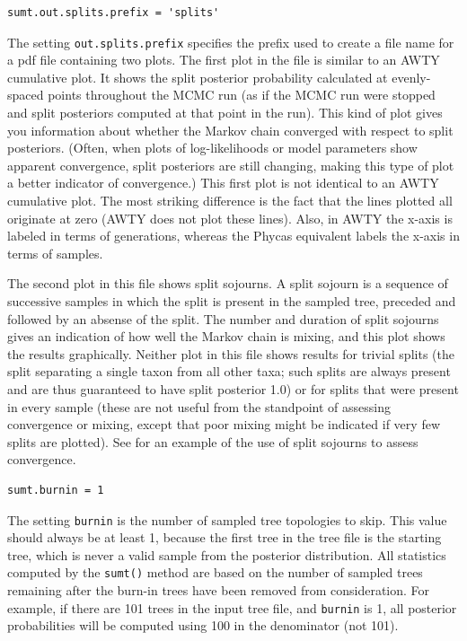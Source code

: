 \documentclass[10pt]{article}
\newcommand{\opt}[1]{{\tt \small #1}\index{#1}}	%
\begin{document}
\begin{samepage}
\begin{verbatim}
sumt.out.splits.prefix = 'splits'
\end{verbatim}
The setting \opt{out.splits.prefix} specifies the prefix used to create a file name for a pdf file containing two plots. The first plot in the file is similar to an AWTY \citep[][\url{http://king2.scs.fsu.edu/CEBProjects/awty/awty_start.php}]{Nylander:2008p471} cumulative plot. It shows the split posterior probability calculated at evenly-spaced points throughout the MCMC run (as if the MCMC run were stopped and split posteriors computed at that point in the run). This kind of plot gives you information about whether the Markov chain converged with respect to split posteriors. (Often, when plots of log-likelihoods or model parameters show apparent convergence, split posteriors are still changing, making this type of plot a better indicator of convergence.) This first plot is not identical to an AWTY cumulative plot. The most striking difference is the fact that the lines plotted all originate at zero (AWTY does not plot these lines). Also, in AWTY the x-axis is labeled in terms of generations, whereas the Phycas equivalent labels the x-axis in terms of samples. 

The second plot in this file shows split sojourns. A split sojourn is a sequence of successive samples in which the split is present in the sampled tree, preceded and followed by an absense of the split. The number and duration of split sojourns gives an indication of how well the Markov chain is mixing, and this plot shows the results graphically. Neither plot in this file shows results for trivial splits (the split separating a single taxon from all other taxa; such splits are always present and are thus guaranteed to have split posterior 1.0) or for splits that were present in every sample (these are not useful from the standpoint of assessing convergence or mixing, except that poor mixing might be indicated if very few splits are plotted). See \citet{LewisLewis2005} for an example of the use of split sojourns to assess convergence. 
\end{samepage}

\begin{samepage}
\begin{verbatim}
sumt.burnin = 1
\end{verbatim}
The setting \opt{burnin} is the number of sampled tree topologies to skip. This value should always be at least 1, because the first tree in the tree file is the starting tree, which is never a valid sample from the posterior distribution. All statistics computed by the {\tt sumt()} method are based on the number of sampled trees remaining after the burn-in trees have been removed from consideration. For example, if there are 101 trees in the input tree file, and \opt{burnin} is 1, all posterior probabilities will be computed using 100 in the denominator (not 101).
\end{samepage}
\end{document}
